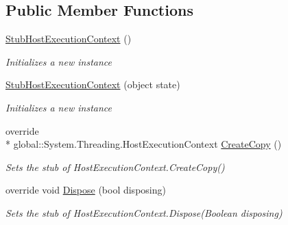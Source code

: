 \subsection*{Public Member Functions}
\begin{DoxyCompactItemize}
\item 
\hyperlink{class_system_1_1_threading_1_1_fakes_1_1_stub_host_execution_context_acabecc4fa0611305f1a423512d4dd4e3}{Stub\-Host\-Execution\-Context} ()
\begin{DoxyCompactList}\small\item\em Initializes a new instance\end{DoxyCompactList}\item 
\hyperlink{class_system_1_1_threading_1_1_fakes_1_1_stub_host_execution_context_a9c9c5abae3470b454d42b1480da3bdd2}{Stub\-Host\-Execution\-Context} (object state)
\begin{DoxyCompactList}\small\item\em Initializes a new instance\end{DoxyCompactList}\item 
override \\*
global\-::\-System.\-Threading.\-Host\-Execution\-Context \hyperlink{class_system_1_1_threading_1_1_fakes_1_1_stub_host_execution_context_aed944fb7c600ff009d6ff23d40b0e28f}{Create\-Copy} ()
\begin{DoxyCompactList}\small\item\em Sets the stub of Host\-Execution\-Context.\-Create\-Copy()\end{DoxyCompactList}\item 
override void \hyperlink{class_system_1_1_threading_1_1_fakes_1_1_stub_host_execution_context_a445947c74a6572202ade7d1ce328ec4b}{Dispose} (bool disposing)
\begin{DoxyCompactList}\small\item\em Sets the stub of Host\-Execution\-Context.\-Dispose(\-Boolean disposing)\end{DoxyCompactList}\end{DoxyCompactItemize}
